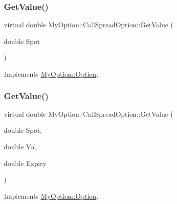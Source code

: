 \subsubsection{\texorpdfstring{Get\+Value()}{GetValue()}\hspace{0.1cm}{\footnotesize\ttfamily [1/3]}}
{\footnotesize\ttfamily virtual double My\+Option\+::\+Call\+Spread\+Option\+::\+Get\+Value (\begin{DoxyParamCaption}\item[{double}]{Spot }\end{DoxyParamCaption})\hspace{0.3cm}{\ttfamily [virtual]}}



Implements \hyperlink{classMyOption_1_1Option_aff32b402a5e44fca9e5a22a142fbbdd6}{My\+Option\+::\+Option}.

\hypertarget{classMyOption_1_1CallSpreadOption_a99b187caf21ba9b6f505923d9e785c12}{}\label{classMyOption_1_1CallSpreadOption_a99b187caf21ba9b6f505923d9e785c12} 
\subsubsection{\texorpdfstring{Get\+Value()}{GetValue()}\hspace{0.1cm}{\footnotesize\ttfamily [2/3]}}
{\footnotesize\ttfamily virtual double My\+Option\+::\+Call\+Spread\+Option\+::\+Get\+Value (\begin{DoxyParamCaption}\item[{double}]{Spot,  }\item[{double}]{Vol,  }\item[{double}]{Expiry }\end{DoxyParamCaption})\hspace{0.3cm}{\ttfamily [virtual]}}



Implements \hyperlink{classMyOption_1_1Option_a78fa248dcb939e0ebaefbb944d5d9cf8}{My\+Option\+::\+Option}.

\hypertarget{classMyOption_1_1CallSpreadOption_a5e88bf671572da6441db916620c5c202}{}\label{classMyOption_1_1CallSpreadOption_a5e88bf671572da6441db916620c5c202} 
